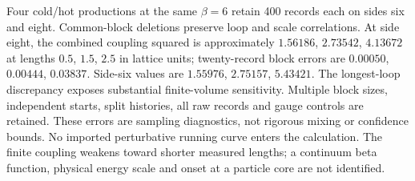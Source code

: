 Four cold/hot productions at the same $\beta=6$ retain 400 records
each on sides six and eight. Common-block deletions preserve loop and
scale correlations. At side eight, the combined coupling squared is
approximately $1.56186$, $2.73542$, $4.13672$ at lengths
$0.5$, $1.5$, $2.5$ in lattice units; twenty-record block errors are
$0.00050$, $0.00444$, $0.03837$. Side-six values are
$1.55976$, $2.75157$, $5.43421$. The longest-loop discrepancy exposes
substantial finite-volume sensitivity. Multiple block sizes, independent
starts, split histories, all raw records and gauge controls are retained.
These errors are sampling diagnostics, not rigorous mixing or confidence
bounds. No imported perturbative running curve enters the calculation.
The finite coupling weakens toward shorter measured lengths; a continuum
beta function, physical energy scale and onset at a particle core are
not identified.
